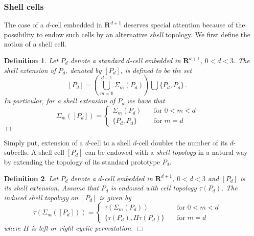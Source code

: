 \documentclass[pdf,12pt,relaxed]{SANDreport}
\newtheorem{defin}{Definition}
\begin{document}
    
    \subsubsection{Shell cells}
    The case of a $d$-cell embedded in $\mathbf{R}^{d+1}$ deserves special attention because of the possibility to endow such cells by an alternative \emph{shell} topology. We first define the notion of a shell cell.
    
    \begin{defin}\label{def:shell-cell}
    Let $P_d$ denote a standard $d$-cell embedded in $\mathbf{R}^{d+1}$, $0<d<3$. The shell extension of $P_d$, denoted by $[P_d]$, is defined to be the set
    \begin{equation}\label{eq:shell-cell}
    [P_d] = \left(\bigcup_{m=0}^{d-1} \Sigma_m(P_d) \right) \bigcup \{P_d, P_d\} \,.
    \end{equation}
    In particular, for a shell extension of $P_d$ we have that
    $$
    \Sigma_m([P_d]) = 
    \left\{
    \begin{array}{rl}  
    \displaystyle \Sigma_m(P_d) & \quad\mbox{for $0<m<d$} \\[1ex]
    \displaystyle \{P_d, P_d\}       & \quad\mbox{for $m=d$}
    \end{array}\right.
    $$
    \hfill $\Box$
    \end{defin}
    
   Simply put, extension of a $d$-cell to a shell $d$-cell doubles the number of its $d$-subcells. A shell cell $[P_d]$ can be endowed with a  \emph{shell topology} in a natural way by extending the topology of its standard prototype $P_d$.
    
    
    \begin{defin}\label{def:shell-topo}
    Let $P_d$ denote a $d$-cell embedded in $\mathbf{R}^{d+1}$, $0<d<3$ and $[P_d]$ is its shell extension. Assume that $P_d$ is endowed with cell topology $\tau(P_d)$. The induced shell topology on $[P_d]$ is given by
        $$
    \tau(\Sigma_m([P_d])) = 
    \left\{
    \begin{array}{rl}  
    \displaystyle \tau(\Sigma_m(P_d)) & \quad\mbox{for $0<m<d$} \\[1ex]
    \displaystyle \{\tau(P_d), \Pi\tau(P_d)\}       & \quad\mbox{for $m=d$}
    \end{array}\right.
    $$
    where $\Pi$ is left or right cyclic permutation.
    \hfill $\Box$
    \end{defin} 
    
\end{document}
